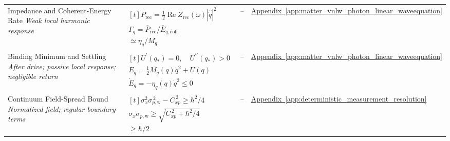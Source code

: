 \begin{longtable}{@{} p{4.5cm} p{6cm} c p{4cm} @{}}
{\raggedright Impedance and Coherent-Energy Rate \newline \textit{Weak local harmonic response}\par} & {\raggedright $\begin{gathered}[t]\overline P_{\mathrm{rec}}=\tfrac12\operatorname{Re}Z_{\mathrm{rec}}(\omega)|\widehat{\dot q}|^2 \\ \Gamma_q=\overline P_{\mathrm{rec}}/\overline E_{q,\mathrm{coh}} \\ \simeq\eta_q/M_q\end{gathered}$\par} & -- & {\raggedright \hyperref[app:matter_vnlw_photon_linear_waveequation]{Appendix~\ref*{app:matter_vnlw_photon_linear_waveequation}}\par} \\

{\raggedright Binding Minimum and Settling \newline \textit{After drive; passive local response; negligible return}\par} & {\raggedright $\begin{gathered}[t]U^{\prime}(q_*)=0,\quad U^{\prime\prime}(q_*)>0 \\ E_q=\tfrac12 M_q(q)\dot q^2+U(q) \\ \dot E_q=-\eta_q(q)\dot q^2\leq0\end{gathered}$\par} & -- & {\raggedright \hyperref[app:matter_vnlw_photon_linear_waveequation]{Appendix~\ref*{app:matter_vnlw_photon_linear_waveequation}}\par} \\

{\raggedright Continuum Field-Spread Bound \newline \textit{Normalized field; regular boundary terms}\par} & {\raggedright $\begin{gathered}[t]\sigma_x^2\sigma_{p,\mathrm w}^{\,2}-C_{xp}^{\,2}\geq\hbar^2/4 \\ \sigma_x\sigma_{p,\mathrm w}\geq\sqrt{C_{xp}^{\,2}+\hbar^2/4} \\ \geq\hbar/2\end{gathered}$\par} & -- & {\raggedright \hyperref[app:deterministic_measurement_resolution]{Appendix~\ref*{app:deterministic_measurement_resolution}}\par} \\


\end{longtable}
